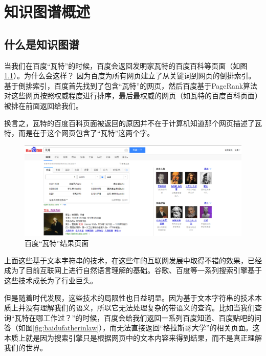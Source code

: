 \chapter{知识图谱概述}\label{sec:Background}
\section{什么是知识图谱}
当我们在百度“瓦特”的时候，百度会返回发明家瓦特的百度百科等页面（如图\ref{fig:baiduWatt}）。为什么会这样？
因为百度为所有网页建立了从关键词到网页的倒排索引。基于倒排索引，百度首先找到了包含“瓦特”的网页，然后百度基于PageRank算法对这些网页按照权威程度进行排序，最后最权威的网页（如瓦特的百度百科页面）被排在前面返回给我们。

换言之，瓦特的百度百科页面被返回的原因并不在于计算机知道那个网页描述了瓦特，而是在于这个网页包含了“瓦特”这两个字。

\begin{figure}
\begin{center}
   \includegraphics[width=12cm]{./figures/part1/baidu.png}
    \caption{百度“瓦特”结果页面}
   \label{fig:baiduWatt}
\end{center}
\end{figure}


上面这些基于文本字符串的技术，在这些年的互联网发展中取得不错的效果，已经成为了目前互联网上进行自然语言理解的基础。谷歌、百度等一系列搜索引擎基于这些技术成长为了行业巨头。


但是随着时代发展，这些技术的局限性也日益明显。因为基于文本字符串的技术本质上并没有理解我们的语义，所以它无法处理复杂的带语义的查询。比如当我们查询“瓦特在哪工作过？”的时候，百度会给我们返回一系列百度知道、百度贴吧的问答（如图\ref{fig:baidufatherinlaw}），而无法直接返回“格拉斯哥大学”的相关页面。这本质上就是因为搜索引擎只是根据网页中的文本内容来得到结果，而不是真正理解我们的世界。

